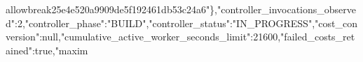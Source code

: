\documentclass[10pt]{article}
\begin{document}
allowbreak{}2\allowbreak{}5\allowbreak{}e\allowbreak{}4\allowbreak{}e\allowbreak{}5\allowbreak{}2\allowbreak{}0\allowbreak{}a\allowbreak{}9\allowbreak{}9\allowbreak{}0\allowbreak{}9\allowbreak{}d\allowbreak{}e\allowbreak{}5\allowbreak{}f\allowbreak{}1\allowbreak{}9\allowbreak{}2\allowbreak{}4\allowbreak{}6\allowbreak{}1\allowbreak{}d\allowbreak{}b\allowbreak{}5\allowbreak{}3\allowbreak{}c\allowbreak{}2\allowbreak{}4\allowbreak{}a\allowbreak{}6\allowbreak{}"\allowbreak{}\}\allowbreak{},\allowbreak{}"\allowbreak{}c\allowbreak{}o\allowbreak{}n\allowbreak{}t\allowbreak{}r\allowbreak{}o\allowbreak{}l\allowbreak{}l\allowbreak{}e\allowbreak{}r\allowbreak{}\_\allowbreak{}i\allowbreak{}n\allowbreak{}v\allowbreak{}o\allowbreak{}c\allowbreak{}a\allowbreak{}t\allowbreak{}i\allowbreak{}o\allowbreak{}n\allowbreak{}s\allowbreak{}\_\allowbreak{}o\allowbreak{}b\allowbreak{}s\allowbreak{}e\allowbreak{}r\allowbreak{}v\allowbreak{}e\allowbreak{}d\allowbreak{}"\allowbreak{}:\allowbreak{}2\allowbreak{},\allowbreak{}"\allowbreak{}c\allowbreak{}o\allowbreak{}n\allowbreak{}t\allowbreak{}r\allowbreak{}o\allowbreak{}l\allowbreak{}l\allowbreak{}e\allowbreak{}r\allowbreak{}\_\allowbreak{}p\allowbreak{}h\allowbreak{}a\allowbreak{}s\allowbreak{}e\allowbreak{}"\allowbreak{}:\allowbreak{}"\allowbreak{}B\allowbreak{}U\allowbreak{}I\allowbreak{}L\allowbreak{}D\allowbreak{}"\allowbreak{},\allowbreak{}"\allowbreak{}c\allowbreak{}o\allowbreak{}n\allowbreak{}t\allowbreak{}r\allowbreak{}o\allowbreak{}l\allowbreak{}l\allowbreak{}e\allowbreak{}r\allowbreak{}\_\allowbreak{}s\allowbreak{}t\allowbreak{}a\allowbreak{}t\allowbreak{}u\allowbreak{}s\allowbreak{}"\allowbreak{}:\allowbreak{}"\allowbreak{}I\allowbreak{}N\allowbreak{}\_\allowbreak{}P\allowbreak{}R\allowbreak{}O\allowbreak{}G\allowbreak{}R\allowbreak{}E\allowbreak{}S\allowbreak{}S\allowbreak{}"\allowbreak{},\allowbreak{}"\allowbreak{}c\allowbreak{}o\allowbreak{}s\allowbreak{}t\allowbreak{}\_\allowbreak{}c\allowbreak{}o\allowbreak{}n\allowbreak{}v\allowbreak{}e\allowbreak{}r\allowbreak{}s\allowbreak{}i\allowbreak{}o\allowbreak{}n\allowbreak{}"\allowbreak{}:\allowbreak{}n\allowbreak{}u\allowbreak{}l\allowbreak{}l\allowbreak{},\allowbreak{}"\allowbreak{}c\allowbreak{}u\allowbreak{}m\allowbreak{}u\allowbreak{}l\allowbreak{}a\allowbreak{}t\allowbreak{}i\allowbreak{}v\allowbreak{}e\allowbreak{}\_\allowbreak{}a\allowbreak{}c\allowbreak{}t\allowbreak{}i\allowbreak{}v\allowbreak{}e\allowbreak{}\_\allowbreak{}w\allowbreak{}o\allowbreak{}r\allowbreak{}k\allowbreak{}e\allowbreak{}r\allowbreak{}\_\allowbreak{}s\allowbreak{}e\allowbreak{}c\allowbreak{}o\allowbreak{}n\allowbreak{}d\allowbreak{}s\allowbreak{}\_\allowbreak{}l\allowbreak{}i\allowbreak{}m\allowbreak{}i\allowbreak{}t\allowbreak{}"\allowbreak{}:\allowbreak{}2\allowbreak{}1\allowbreak{}6\allowbreak{}0\allowbreak{}0\allowbreak{},\allowbreak{}"\allowbreak{}f\allowbreak{}a\allowbreak{}i\allowbreak{}l\allowbreak{}e\allowbreak{}d\allowbreak{}\_\allowbreak{}c\allowbreak{}o\allowbreak{}s\allowbreak{}t\allowbreak{}s\allowbreak{}\_\allowbreak{}r\allowbreak{}e\allowbreak{}t\allowbreak{}a\allowbreak{}i\allowbreak{}n\allowbreak{}e\allowbreak{}d\allowbreak{}"\allowbreak{}:\allowbreak{}t\allowbreak{}r\allowbreak{}u\allowbreak{}e\allowbreak{},\allowbreak{}"\allowbreak{}m\allowbreak{}a\allowbreak{}x\allowbreak{}i\allowbreak{}m\allow
\end{document}
